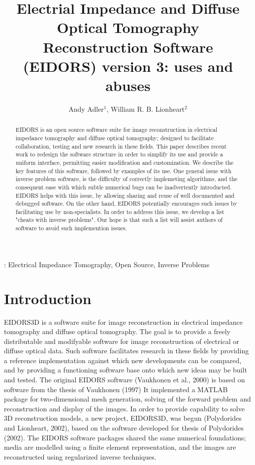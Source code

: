 \documentclass[12pt]{iopart}
\begin{document}
\title{Electrial Impedance and Diffuse Optical
       Tomography Reconstruction Software (EIDORS) version 3: uses and abuses}
\author{Andy Adler$^1$, William R. B. Lionheart$^2$}
\address{$^1$ School of Information Technology and Engineering (SITE), University of Ottawa, Canada}
\address{$^2$ School of Mathematics, University of Manchester, U.K.}

\begin{abstract} %

EIDORS is an open source software suite for image reconstruction in
electrical impedance tomography and diffuse optical tomography;
designed to facilitate collaboration, testing and new research
in these fields.  This paper describes recent work to
redesign the software structure in order to simplify its use
and provide a uniform interface,
permitting easier modification and customization.
We describe the key features of this software, followed by
examples of its use.
One general issue with inverse problem software, is the difficulty
of correctly implemeting algorithms, and the consequent ease with
which subtle numerical bugs can be inadvertently introducted.
EIDORS helps with this issue, by allowing sharing and reuse
of well documented and debugged software. On the other hand, 
EIDORS potentially encourages such issues by facilitating use
by non-specialists. In order to address this issue, we develop
a list "cheats with inverse problems". Our hope is that such
a list will assist authors of software to avoid such implemention
issues.


\end{abstract}
:
Electrical Impedance Tomography,
Open Source,
Inverse Problems

\section{Introduction}

EIDORS3D is a software suite for image reconstruction in
electrical impedance tomography and diffuse optical tomography.
The goal is to provide a freely distributable and modifyable
software for image reconstruction of electrical 
or diffuse optical data. Such software facilitates research
in these fields by providing a reference implementation
against which new developments can be compared, and by
providing a functioning software base onto which new
ideas may be built and tested.
The original EIDORS software (Vaukhonen et al., 2000) 
is based on software from the thesis of Vaukhonen (1997)
It implemented a MATLAB package for two-dimensional mesh generation,
solving of the forward
problem and reconstruction and display of the images.
In order to provide capability to solve 3D reconstruction models,
a new project, EIDORS3D, was begun (Polydorides and Lionheart, 2002),
based on the software developed for thesis of Polydorides (2002).
The EIDORS software packages shared the same numerical
foundations; media are modelled using a finite element representation,
and the images are reconstructed using regularized inverse techniques.
\end{document}
